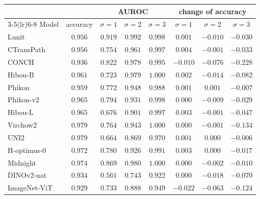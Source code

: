 \begin{tabular}{lccccccc}
\toprule
& & \multicolumn{3}{c}{AUROC} & \multicolumn{3}{c}{change of accuracy} \\
\cmidrule(lr){3-5}\cmidrule(lr){6-8}
Model & accuracy & $\sigma{=}1$ & $\sigma{=}2$ & $\sigma{=}3$ & $\sigma{=}1$ & $\sigma{=}2$ & $\sigma{=}3$ \\
\midrule
Lunit & $0.956$ & $0.919$ & $0.992$ & $0.998$ & $0.001$ & $-0.010$ & $-0.030$ \\
CTransPath & $0.956$ & $0.754$ & $0.961$ & $0.997$ & $0.004$ & $-0.001$ & $-0.033$ \\
CONCH & $0.936$ & $0.822$ & $0.978$ & $0.995$ & $-0.010$ & $-0.076$ & $-0.228$ \\
Hibou-B & $0.961$ & $0.723$ & $0.979$ & $1.000$ & $0.002$ & $-0.014$ & $-0.082$ \\
Phikon & $0.959$ & $0.772$ & $0.948$ & $0.988$ & $0.001$ & $0.001$ & $-0.007$ \\
Phikon-v2 & $0.965$ & $0.794$ & $0.931$ & $0.998$ & $0.000$ & $-0.009$ & $-0.029$ \\
Hibou-L & $0.965$ & $0.676$ & $0.901$ & $0.997$ & $0.003$ & $-0.001$ & $-0.047$ \\
Virchow2 & $0.979$ & $0.764$ & $0.943$ & $1.000$ & $0.000$ & $-0.001$ & $-0.134$ \\
UNI2 & $0.979$ & $0.664$ & $0.869$ & $0.970$ & $0.001$ & $0.000$ & $-0.006$ \\
H-optimus-0 & $0.972$ & $0.780$ & $0.926$ & $0.991$ & $0.003$ & $0.000$ & $-0.017$ \\
Midnight & $0.974$ & $0.869$ & $0.980$ & $1.000$ & $0.000$ & $-0.002$ & $-0.010$ \\
\midrule
DINOv2-nat & $0.934$ & $0.561$ & $0.743$ & $0.922$ & $0.000$ & $-0.018$ & $-0.070$ \\
ImageNet-ViT & $0.929$ & $0.733$ & $0.888$ & $0.949$ & $-0.022$ & $-0.063$ & $-0.124$ \\
\bottomrule
\end{tabular}
